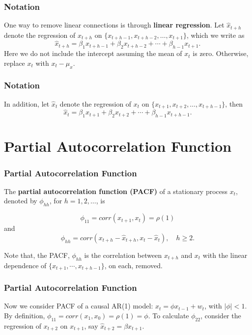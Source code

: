 \documentclass[%
xcolor=pdftex]{beamer}
\begin{document}
\begin{frame}
\frametitle{Notation}

One way to remove linear connections is through \textbf{linear
regression}. Let $\hat{x}_{t+h}$ denote the regression of $x_{t+h}$ on
$\{x_{t+h-1},x_{t+h-2},\ldots,x_{t+1}\}$, which we write as
\begin{equation}
\hat{x}_{t+h} = \beta_1 x_{t+h-1} + \beta_2 x_{t+h-2} + \cdots + \beta_{h-1} x_{t+1}.
\end{equation}
Here we do not include the intercept assuming the mean of $x_t$
is zero. Otherwise, replace $x_t$ with $x_t - \mu_x$.

\end{frame}

\begin{frame}
\frametitle{Notation}

In addition, let $\hat{x}_t$ denote the regression of
$x_t$ on $\{x_{t+1},x_{t+2},\ldots,x_{t+h-1}\}$, then
\begin{equation}
\hat{x}_t = \beta_1 x_{t+1} + \beta_2 x_{t+2} + \cdots + \beta_{h-1} x_{t+h-1}.
\end{equation}

\end{frame}

\section{Partial Autocorrelation Function}
\frame{\tableofcontents[currentsection]}

\begin{frame}
\frametitle{Partial Autocorrelation Function}

The {\bf partial autocorrelation
function (PACF)} of a stationary process $x_t$, denoted by
$\phi_{hh}$, for $h=1,2,\ldots$, is

\begin{equation}
\phi_{11} = corr(x_{t+1},x_t) = \rho(1)
\end{equation}
and
\begin{equation}
\phi_{hh}=corr(x_{t+h}-\hat{x}_{t+h}, x_t-\hat{x}_t), \quad h\ge 2.
\end{equation}

Note that, the PACF, $\phi_{hh}$ is the correlation between
$x_{t+h}$ and $x_{t}$ with the linear dependence of
$\{x_{t+1},\cdots,x_{t+h-1}\}$, on each, removed.

\end{frame}

\begin{frame}
\frametitle{Partial Autocorrelation Function}

Now we consider PACF of a causal AR(1) model: $x_t=\phi
x_{t-1}+w_t$, with $|\phi|<1$. By definition,
$\phi_{11}=corr(x_1,x_0)=\rho(1)=\phi$. To calculate
$\phi_{22}$, consider the regression of $x_{t+2}$ on $x_{t+1}$, say
$\hat{x}_{t+2}=\beta x_{t+1}$.

\end{frame}
\end{document}
